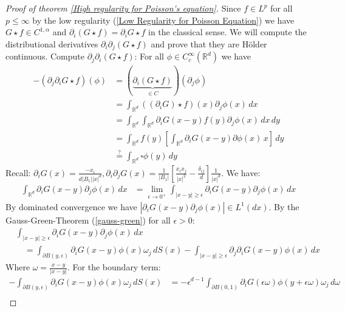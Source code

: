 \documentclass{report}
\theoremstyle{tommy}
\begin{document}
  \begin{proof}[Proof of theorem \ref{High regularity for Poisson's equation}]
    Since \(f \in L^p\) for all \(p \le \infty\) by the low regularity (\ref{Low Regularity for Poisson Equation}) we have \(G \star f \in C^{1, \alpha}\) and \(\partial_i (G \star f) = \partial_i G \star f\)
    in the classical sense. We will compute the distributional derivatives \(\partial_i \partial_j (G \star f)\) and prove that they are Hölder continuous. Compute \(\partial_j \partial_i (G \star f)\): For all \(\phi \in C_c^\infty(\mathbb{R}^d)\) we have
    \begin{align*}
      -(\partial_j \partial_i G \star f)(\phi)
      &= (\underbrace{\partial_i(G \star f)}_{\in C})(\partial_j \phi) \\
      &= \int_{\mathbb{R}^d}((\partial_i G)\star f)(x) \partial_j \phi(x) \, dx \\
      &= \int_{\mathbb{R}^d}\int_{\mathbb{R}^d} \partial_i G(x-y) f(y) \partial_j \phi(x) \, dx \, dy \\
      &= \int_{\mathbb{R}^d} f(y) \left[\int_{\mathbb{R}^d} \partial_i G(x-y)\partial \phi(x) \, x\right] \, dy \\
      &\overset{?}{=} \int_{\mathbb{R}^d} \square \phi(y) \, dy
    \end{align*}
    Recall: \(\partial_i G(x) = \frac{-x_i}{d|B_1||x|^d}, \partial_i \partial_j G(x) = \frac{1}{|B_1|}\left[\frac{x_i x_j}{|x|^2}- \frac{\delta_{ij}}{d}\right] \frac{1}{|x|^d}\). We have:
    \begin{align*}
      \int_{\mathbb{R}^d} \partial_i G(x-y) \partial_j \phi(x) \, dx
      &= \lim_{\epsilon \to 0^+}\int_{|x-y| \ge \epsilon} \partial_i G(x-y) \partial_j \phi(x) \, dx
    \end{align*}
    By dominated convergence we have \(|\partial_i G(x-y) \partial_j \phi(x)| \in L^1(dx)\).
    By the Gauss-Green-Theorem (\ref{gauss-green}) for all \(\epsilon > 0\):
    \begin{align*}
      &\int_{|x-y| \ge \epsilon} \partial_i G(x-y) \partial_j \phi(x) \, dx \\
      &\quad= \int_{\partial B(y, \epsilon)}\partial_i G(x-y) \phi(x) \omega_j \, dS(x) - \int_{|x-y| \ge \epsilon} \partial_j \partial_i G(x-y) \phi(x) \, dx
    \end{align*}
    Where \(\omega = \frac{x-y}{|x-y|}\). For the boundary term:
    \begin{align*}
      - \int_{\partial B(y, \epsilon)} \partial_i G(x-y) \phi(x) \omega_j \, dS(x)
      &= - \epsilon^{d-1} \int_{\partial B(0, 1)} \partial_i G(\epsilon \omega) \phi(y + \epsilon \omega) \omega_j \, d\omega \\

\end{align*}
\end{proof}
\end{document}
